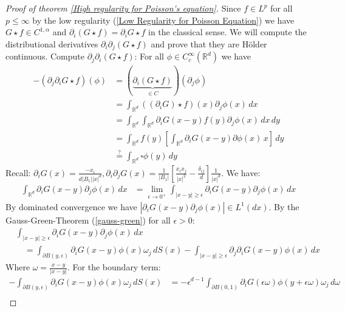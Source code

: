 \documentclass{report}
\theoremstyle{tommy}
\begin{document}
  \begin{proof}[Proof of theorem \ref{High regularity for Poisson's equation}]
    Since \(f \in L^p\) for all \(p \le \infty\) by the low regularity (\ref{Low Regularity for Poisson Equation}) we have \(G \star f \in C^{1, \alpha}\) and \(\partial_i (G \star f) = \partial_i G \star f\)
    in the classical sense. We will compute the distributional derivatives \(\partial_i \partial_j (G \star f)\) and prove that they are Hölder continuous. Compute \(\partial_j \partial_i (G \star f)\): For all \(\phi \in C_c^\infty(\mathbb{R}^d)\) we have
    \begin{align*}
      -(\partial_j \partial_i G \star f)(\phi)
      &= (\underbrace{\partial_i(G \star f)}_{\in C})(\partial_j \phi) \\
      &= \int_{\mathbb{R}^d}((\partial_i G)\star f)(x) \partial_j \phi(x) \, dx \\
      &= \int_{\mathbb{R}^d}\int_{\mathbb{R}^d} \partial_i G(x-y) f(y) \partial_j \phi(x) \, dx \, dy \\
      &= \int_{\mathbb{R}^d} f(y) \left[\int_{\mathbb{R}^d} \partial_i G(x-y)\partial \phi(x) \, x\right] \, dy \\
      &\overset{?}{=} \int_{\mathbb{R}^d} \square \phi(y) \, dy
    \end{align*}
    Recall: \(\partial_i G(x) = \frac{-x_i}{d|B_1||x|^d}, \partial_i \partial_j G(x) = \frac{1}{|B_1|}\left[\frac{x_i x_j}{|x|^2}- \frac{\delta_{ij}}{d}\right] \frac{1}{|x|^d}\). We have:
    \begin{align*}
      \int_{\mathbb{R}^d} \partial_i G(x-y) \partial_j \phi(x) \, dx
      &= \lim_{\epsilon \to 0^+}\int_{|x-y| \ge \epsilon} \partial_i G(x-y) \partial_j \phi(x) \, dx
    \end{align*}
    By dominated convergence we have \(|\partial_i G(x-y) \partial_j \phi(x)| \in L^1(dx)\).
    By the Gauss-Green-Theorem (\ref{gauss-green}) for all \(\epsilon > 0\):
    \begin{align*}
      &\int_{|x-y| \ge \epsilon} \partial_i G(x-y) \partial_j \phi(x) \, dx \\
      &\quad= \int_{\partial B(y, \epsilon)}\partial_i G(x-y) \phi(x) \omega_j \, dS(x) - \int_{|x-y| \ge \epsilon} \partial_j \partial_i G(x-y) \phi(x) \, dx
    \end{align*}
    Where \(\omega = \frac{x-y}{|x-y|}\). For the boundary term:
    \begin{align*}
      - \int_{\partial B(y, \epsilon)} \partial_i G(x-y) \phi(x) \omega_j \, dS(x)
      &= - \epsilon^{d-1} \int_{\partial B(0, 1)} \partial_i G(\epsilon \omega) \phi(y + \epsilon \omega) \omega_j \, d\omega \\

\end{align*}
\end{proof}
\end{document}
